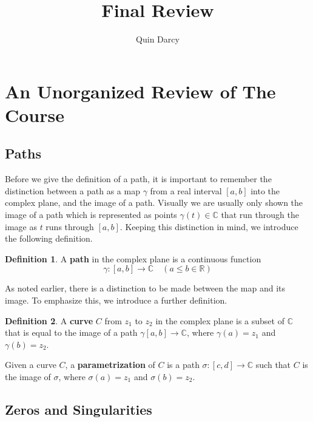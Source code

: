 \documentclass{article}
\theoremstyle{definition}
\newtheorem{definition}{Definition}[section]
\theoremstyle{remark}
\begin{document}
\title{Final Review}
\author{Quin Darcy}
\maketitle

\section{An Unorganized Review of The Course}

\subsection{Paths}

Before we give the definition of a path, it is important to remember the distinction between a path as a map $\gamma$ from a real interval $[a,b]$ into the complex plane, and the image of a path. Visually we are usually only shown the image of a path which is represented as points $\gamma(t)\in\mathbb{C}$ that run through the image as $t$ runs through $[a,b]$. Keeping this distinction in mind, we introduce the following definition.

\begin{definition}
    A \textbf{path} in the complex plane is a continuous function
        \begin{equation*}
            \gamma\colon[a,b]\rightarrow\mathbb{C}\quad(a\leq b\in\mathbb{R})
        \end{equation*}
\end{definition}

\noindent As noted earlier, there is a distinction to be made between the map and its image. To emphasize this, we introduce a further definition.

\begin{definition}
    A \textbf{curve} $C$ from $z_1$ to $z_2$ in the complex plane is a subset of $\mathbb{C}$ that is equal to the image of a path $\gamma[a,b]\rightarrow\mathbb{C}$, where $\gamma(a)=z_1$ and $\gamma(b)=z_2$.\par Given a curve $C$, a \textbf{parametrization} of $C$ is a path $\sigma\colon[c,d]\rightarrow\mathbb{C}$ such that $C$ is the image of $\sigma$, where $\sigma(a)=z_1$ and $\sigma(b)=z_2$.
\end{definition}

\subsection{Zeros and Singularities}
\end{document}
